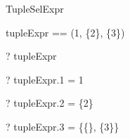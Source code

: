 \begin{zsection}
  \SECTION TupleSelExpr
\end{zsection}

\begin{zed}
  tupleExpr == (1, \{2\}, \power \{3\})
\end{zed}

\begin{zed}
  \vdash? tupleExpr \in \nat \cross \power \nat \cross \power \power \nat\\
\end{zed}
\begin{zed} \vdash? tupleExpr.1 = 1 \end{zed}
\begin{zed} \vdash? tupleExpr.2 = \{2\} \end{zed}
\begin{zed} \vdash? tupleExpr.3 = \{\{\}, \{3\}\} \end{zed}
